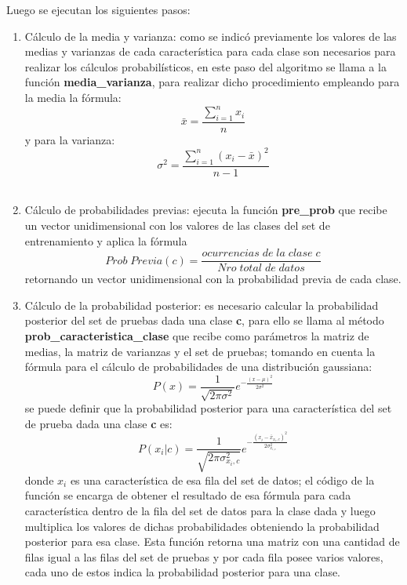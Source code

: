 Luego se ejecutan los siguientes pasos:\\
\begin{enumerate}
	\item Cálculo de la media y varianza:
	como se indicó previamente los valores de las medias y varianzas de cada característica para cada clase son necesarios
	para realizar los cálculos probabilísticos, en este paso del algoritmo se llama a la función \textbf{media\_varianza}, para
	realizar dicho procedimiento empleando para la media la fórmula: \[\bar{x}=\frac{\sum_{i=1}^n{x_{i}}}{n}\] y para la varianza:
	\[\sigma^2=\frac{\sum_{i=1}^n{\left(x_{i}-\bar{x}\right)^2}}{n - 1}\]\\
	\item Cálculo de probabilidades previas:
	ejecuta la función \textbf{pre\_prob} que recibe un vector unidimensional con los valores de las clases
	del set de entrenamiento y aplica la fórmula
	\[Prob\;Previa\left(c\right)=\frac{ocurrencias\;de\;la\;clase\;c}{Nro\;total\;de\;datos}\]
	retornando un vector unidimensional con la probabilidad previa de cada clase.\\
	\item Cálculo de la probabilidad posterior:
	es necesario calcular la probabilidad posterior del set de pruebas dada una clase \textbf{c},
	para ello se llama al método \textbf{prob\_caracteristica\_clase} que recibe como
	parámetros la matriz de medias, la matriz de varianzas y el set de pruebas; tomando en cuenta la
	fórmula para el cálculo de probabilidades de una distribución gaussiana:
	\[
	P\left(x\right) = \frac{1}{\sqrt{2\pi\sigma^{2}}}e^{-\frac{\left(x-\mu\right)^{2}}{2\sigma^{2}}}
	\]
	se puede definir que la probabilidad posterior para una característica del set de prueba dada una
	clase \textbf{c} es:
	\[
	P\left(x_{i}|c\right) = \frac{1}{\sqrt{2\pi\sigma^{2}_{x_{i},c}}}
	e^{-\frac{\left(x_{i}-\bar{x}_{x_{i},c}\right)^{2}}{2\sigma^{2}_{x_{i,c}}}}
	\]
	donde $x_{i}$ es una característica de esa fila del set de datos; el código de la función se encarga de
	obtener el resultado de esa fórmula para cada característica dentro de la fila del set de datos para
	la clase dada y luego multiplica los valores de dichas probabilidades obteniendo la probabilidad posterior
	para esa clase. Esta función retorna una matriz con una cantidad de filas igual a las filas del set de
	pruebas y por cada fila posee varios valores, cada uno de estos indica la probabilidad posterior para una clase.\\


\end{enumerate}

